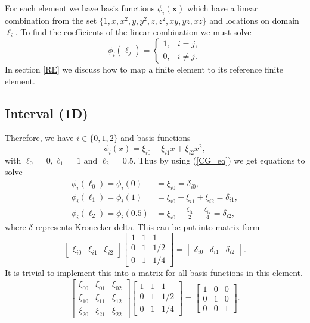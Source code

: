 \documentclass[12pt]{ociamthesis}
\begin{document}
For each element we have basis functions $\phi_i(\mathbf{x})$ which have a linear combination from the set $\{1, x, x^2, y, y^2, z, z^2, xy, yz, xz\}$ and locations on domain $\ell_i$.  To find the coefficients of the linear combination we must solve
\begin{equation} \label{CG_eq}
\phi_i(\ell_j) =
\begin{cases}
1, &i=j,\\
0, &i\neq j.
\end{cases}
\end{equation}
In section \ref{RE} we discuss how to map a finite element to its reference finite element.
\subsection{Interval (1D)}
Therefore, we have $i \in \{0, 1, 2\}$ and basis functions 
\begin{equation}
\phi_i(x) = \xi_{i0} + \xi_{i1}x + \xi_{i2}x^2,
\end{equation}
with $\ell_0 = 0, \ell_1 = 1$ and $\ell_2 = 0.5$. Thus by using (\ref{CG_eq}) we get equations to solve
\begin{align}
\phi_i(\ell_0) = \phi_i(0) &= \xi_{i0} = \delta_{i0},\\
\phi_i(\ell_1) = \phi_i(1) &= \xi_{i0} + \xi_{i1} + \xi_{i2} = \delta_{i1},\\
\phi_i(\ell_2) = \phi_i(0.5) &= \xi_{i0} + \frac{\xi_{i1}}{2} + \frac{\xi_{i2}}{4} = \delta_{i2},
\end{align}
where $\delta$ represents Kronecker delta. This can be put into matrix form
\begin{equation}
\left[ \begin{matrix}
\xi_{i0} & \xi_{i1} & \xi_{i2}
\end{matrix} \right]
\left[ \begin{matrix}
1 & 1 & 1 \\
0 & 1 & 1/2 \\
0 & 1 & 1/4
\end{matrix} \right] = 
\left[ \begin{matrix}
\delta_{i0} & \delta_{i1} & \delta_{i2}
\end{matrix} \right].
\end{equation}
It is trivial to implement this into a matrix for all basis functions in this element.
\begin{equation}
\left[ \begin{matrix}
\xi_{00} & \xi_{01} & \xi_{02} \\
\xi_{10} & \xi_{11} & \xi_{12} \\
\xi_{20} & \xi_{21} & \xi_{22} 
\end{matrix} \right]
\left[ \begin{matrix}
1 & 1 & 1 \\
0 & 1 & 1/2 \\
0 & 1 & 1/4
\end{matrix} \right] = 
\left[ \begin{matrix}
1 & 0 & 0 \\
0 & 1 & 0 \\
0 & 0 & 1
\end{matrix} \right].
\end{equation}
\end{document}
